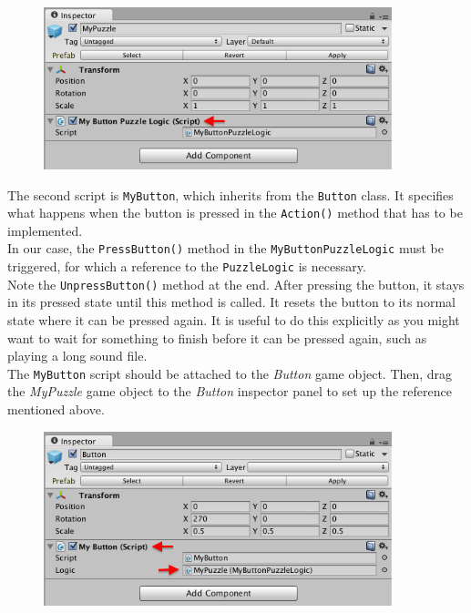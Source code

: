 \documentclass[a4paper]{article}
\begin{document}
\begin{figure}[H]
\centering
\includegraphics[width=0.9\textwidth]{figures/4-1.png}
\end{figure}

The second script is \texttt{MyButton}, which inherits from the \texttt{Button} class. It specifies what happens when the button is pressed in the \texttt{Action()} method that has to be implemented.\\

In our case, the \texttt{PressButton()} method in the \texttt{MyButtonPuzzleLogic} must be triggered, for which a reference to the \texttt{PuzzleLogic} is necessary.\\



Note the \texttt{UnpressButton()} method at the end. After pressing the button, it stays in its pressed state until this method is called. It resets the button to its normal state where it can be pressed again.
It is useful to do this explicitly as you might want to wait for something to finish before it can be pressed again, such as playing a long sound file.\\

The \texttt{MyButton} script should be attached to the \textit{Button} game object. Then, drag the \textit{MyPuzzle} game object to the \textit{Button} inspector panel to set up the reference mentioned above.\\

\begin{figure}[H]
\centering
\includegraphics[width=0.9\textwidth]{figures/4-2.png}
\end{figure}
\end{document}
